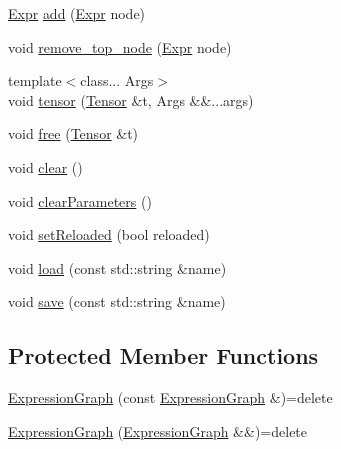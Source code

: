 \begin{DoxyCompactItemize}
\hyperlink{namespacemarian_a498d8baf75b754011078b890b39c8e12}{Expr} \hyperlink{classmarian_1_1ExpressionGraph_a95bb5e6efbc99952867e46f5db9dc461}{add} (\hyperlink{namespacemarian_a498d8baf75b754011078b890b39c8e12}{Expr} node)
\item 
void \hyperlink{classmarian_1_1ExpressionGraph_a6ac51867f0abfd22696e85b392f1bfcb}{remove\+\_\+top\+\_\+node} (\hyperlink{namespacemarian_a498d8baf75b754011078b890b39c8e12}{Expr} node)
\item 
{\footnotesize template$<$class... Args$>$ }\\void \hyperlink{classmarian_1_1ExpressionGraph_a7bd933313f66b7a696292fc17b21d78b}{tensor} (\hyperlink{namespacemarian_a88b71ec34bb354564cddc24eb80f7e14}{Tensor} \&t, Args \&\&...args)
\item 
void \hyperlink{classmarian_1_1ExpressionGraph_a12e72d92651d3eb42762a0fdccf3c560}{free} (\hyperlink{namespacemarian_a88b71ec34bb354564cddc24eb80f7e14}{Tensor} \&t)
\item 
void \hyperlink{classmarian_1_1ExpressionGraph_a97c49d6448e774f350083559f02719ad}{clear} ()
\item 
void \hyperlink{classmarian_1_1ExpressionGraph_a3525ef405ce9f66ec86a47e9178dad72}{clear\+Parameters} ()
\item 
void \hyperlink{classmarian_1_1ExpressionGraph_ae3a2ead5df1981b78a78f72c363b5a47}{set\+Reloaded} (bool reloaded)
\item 
void \hyperlink{classmarian_1_1ExpressionGraph_a67747b40ca80d7dc5b5dbd3d45793cce}{load} (const std\+::string \&name)
\item 
void \hyperlink{classmarian_1_1ExpressionGraph_a760757f21a572d7e80baf2c1cb0d3521}{save} (const std\+::string \&name)
\end{DoxyCompactItemize}
\subsection*{Protected Member Functions}
\begin{DoxyCompactItemize}
\item 
\hyperlink{classmarian_1_1ExpressionGraph_a65e074b28afd37450ef025bb97e06efa}{Expression\+Graph} (const \hyperlink{classmarian_1_1ExpressionGraph}{Expression\+Graph} \&)=delete
\item 
\hyperlink{classmarian_1_1ExpressionGraph_ac1669810aad34acc14f6f2e5eea13a9d}{Expression\+Graph} (\hyperlink{classmarian_1_1ExpressionGraph}{Expression\+Graph} \&\&)=delete
\end{DoxyCompactItemize}
